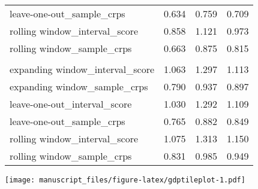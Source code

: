 \documentclass[
]{article}
\begin{document}
\begin{longtable}{l|rrr}
leave-one-out\_sample\_crps & 0.634 & 0.759 & 0.709 \\ 
rolling window\_interval\_score & 0.858 & 1.121 & 0.973 \\ 
rolling window\_sample\_crps & 0.663 & 0.875 & 0.815 \\ 
\midrule\addlinespace[2.5pt]
\multicolumn{4}{l}{horizon = 1.5} \\ 
\midrule\addlinespace[2.5pt]
expanding window\_interval\_score & 1.063 & 1.297 & 1.113 \\ 
expanding window\_sample\_crps & 0.790 & 0.937 & 0.897 \\ 
leave-one-out\_interval\_score & 1.030 & 1.292 & 1.109 \\ 
leave-one-out\_sample\_crps & 0.765 & 0.882 & 0.849 \\ 
rolling window\_interval\_score & 1.075 & 1.313 & 1.150 \\ 
rolling window\_sample\_crps & 0.831 & 0.985 & 0.949 \\ 
\bottomrule
\end{longtable}

\texttt{[image: manuscript\_files/figure-latex/gdptileplot-1.pdf]}
\end{document}

